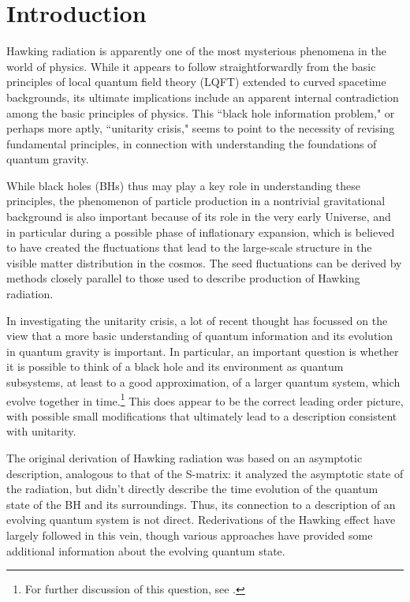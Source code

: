 \documentclass[12pt]{article}
\numberwithin{equation}{section}
\begin{document}
\section{Introduction}

Hawking radiation\cite{Hawk} is apparently one of the most mysterious phenomena in the world of physics.  While it appears to follow straightforwardly from the basic principles of local quantum field theory (LQFT) extended to curved spacetime backgrounds, its ultimate implications include an apparent internal contradiction among the basic principles of physics.  This ``black hole information problem," or perhaps more aptly, ``unitarity crisis," seems to point to the necessity of revising fundamental principles, in connection with understanding the foundations of quantum gravity.

While black holes (BHs) thus may play a key role in understanding these principles, the phenomenon of particle production in a nontrivial gravitational background is also important because of its role in the very early Universe, and in particular during a possible phase of inflationary expansion, which is believed to have created the fluctuations that lead to the large-scale structure in the visible matter distribution in the cosmos.  The seed fluctuations can be derived by methods closely parallel to those used to describe production of Hawking radiation.

In investigating the unitarity crisis, a lot of recent thought has focussed on the view that a more basic understanding of quantum information and its evolution in quantum gravity is important.  In particular, an important question is whether it is possible to think of a black hole and its environment as quantum subsystems, at least to a good approximation, of a larger quantum system, which evolve together in time.\footnote{For further discussion of this question, see \cite{SGsub}.}
This does appear to be the correct leading order picture, with possible small modifications that ultimately lead to a description consistent with unitarity.  

The original derivation\cite{Hawk} of Hawking radiation was based on an asymptotic description, analogous to that of the S-matrix:  it analyzed the asymptotic state of the radiation, but didn't directly describe the time evolution of the quantum state of the BH and its surroundings.  Thus, its connection to a description of an evolving quantum system is not direct.
Rederivations of the Hawking effect have largely followed in this vein, though various approaches have provided some additional information about the evolving quantum state.
\end{document}
